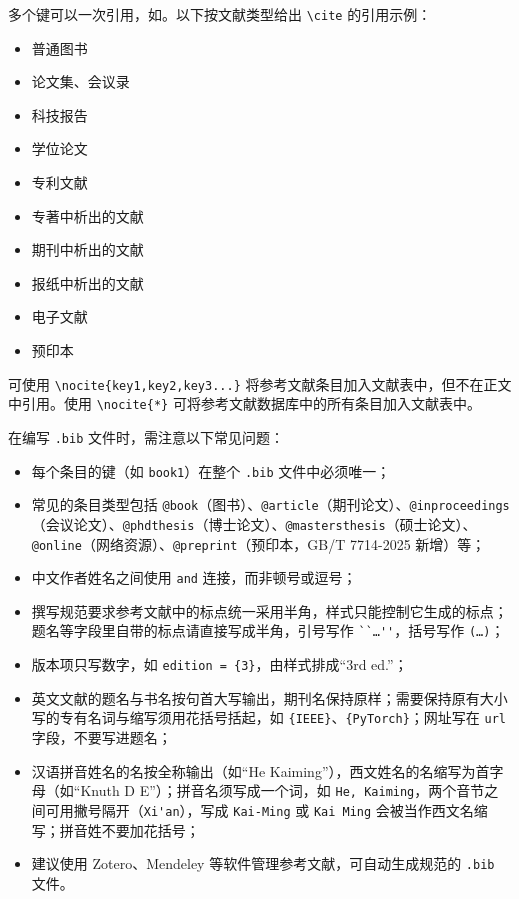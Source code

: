 多个键可以一次引用，如\cite{book1,online1,article1}。以下按文献类型给出 \verb|\cite| 的引用示例：
\begin{itemize}
  \item 普通图书\cite{book1,book2}
  \item 论文集、会议录\cite{conf1,conf2}
  \item 科技报告\cite{techreport1,techreport2}
  \item 学位论文\cite{thesis1,thesis2,thesis3}
  \item 专利文献\cite{patent1,patent2}
  \item 专著中析出的文献\cite{inbook1,inbook2}
  \item 期刊中析出的文献\cite{qin2021,article1,guo_deepseek-r1_2025}
  \item 报纸中析出的文献\cite{newspaper1,newspaper2}
  \item 电子文献\cite{online1,online2,online3}
  \item 预印本\cite{preprint1,preprint2}
\end{itemize}

可使用 \verb|\nocite{key1,key2,key3...}| 将参考文献条目加入文献表中，但不在正文中引用。使用 \verb|\nocite{*}| 可将参考文献数据库中的所有条目加入文献表中。

在编写 \texttt{.bib} 文件时，需注意以下常见问题：
\begin{itemize}
  \item 每个条目的键（如 \texttt{book1}）在整个 \texttt{.bib} 文件中必须唯一；
  \item 常见的条目类型包括 \texttt{@book}（图书）、\texttt{@article}（期刊论文）、\texttt{@inproceedings}（会议论文）、\texttt{@phdthesis}（博士论文）、\texttt{@mastersthesis}（硕士论文）、\texttt{@online}（网络资源）、\texttt{@preprint}（预印本，GB/T 7714-2025 新增）等；
  \item 中文作者姓名之间使用 \texttt{and} 连接，而非顿号或逗号；
  \item 撰写规范要求参考文献中的标点统一采用半角，样式只能控制它生成的标点；题名等字段里自带的标点请直接写成半角，引号写作 \verb|``…''|，括号写作 \verb|(…)|；
  \item 版本项只写数字，如 \verb|edition = {3}|，由样式排成“3rd ed.”；
  \item 英文文献的题名与书名按句首大写输出，期刊名保持原样；需要保持原有大小写的专有名词与缩写须用花括号括起，如 \verb|{IEEE}|、\verb|{PyTorch}|；网址写在 \texttt{url} 字段，不要写进题名；
  \item 汉语拼音姓名的名按全称输出（如“He Kaiming”），西文姓名的名缩写为首字母（如“Knuth D E”）；拼音名须写成一个词，如 \verb|He, Kaiming|，两个音节之间可用撇号隔开（\verb|Xi'an|），写成 \verb|Kai-Ming| 或 \verb|Kai Ming| 会被当作西文名缩写；拼音姓不要加花括号；
  \item 建议使用 Zotero、Mendeley 等软件管理参考文献，可自动生成规范的 \texttt{.bib} 文件。
\end{itemize}

